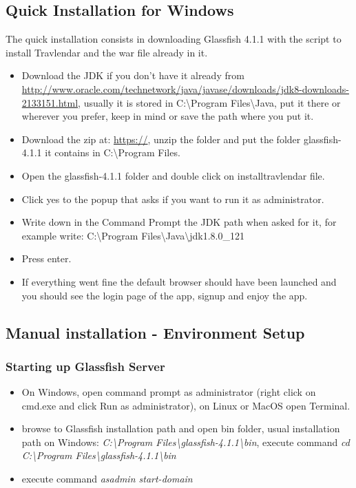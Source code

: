 \subsection{Quick Installation for Windows}
The quick installation consists in downloading Glassfish 4.1.1 with the script to install Travlendar and the war file already in it.
\begin{itemize}
\item Download the JDK if you don't have it already from\\ \href{url}{http://www.oracle.com/technetwork/java/javase/downloads/jdk8-downloads-2133151.html}, usually it is stored in C:\textbackslash Program Files\textbackslash Java, put it there or wherever you prefer, keep in mind or save the path where you put it.
\item Download the zip at: \href{url}{https://}, unzip the folder and put the folder glassfish-4.1.1 it contains in C:\textbackslash Program Files.
\item Open the glassfish-4.1.1 folder and double click on installtravlendar file.
\item Click yes to the popup that asks if you want to run it as administrator.
\item Write down in the Command Prompt the JDK path when asked for it, for example write: C:\textbackslash Program Files\textbackslash Java\textbackslash jdk1.8.0_121
\item Press enter.
\item If everything went fine the default browser should have been launched and you should see the login page of the app, signup and enjoy the app.
\end{itemize}




\subsection{Manual installation - Environment Setup}
\subsubsection{Starting up Glassfish Server}
\begin{itemize}
\item On Windows, open command prompt as administrator (right click on cmd.exe and click Run as administrator), on Linux or MacOS open Terminal.
\item browse to Glassfish installation path and open bin folder, usual installation path on Windows: \textit{C:\textbackslash Program Files\textbackslash glassfish-4.1.1\textbackslash bin}, execute command \textit{cd C:\textbackslash Program Files\textbackslash glassfish-4.1.1\textbackslash bin}
\item execute command \textit{asadmin start-domain}
\end{itemize}

